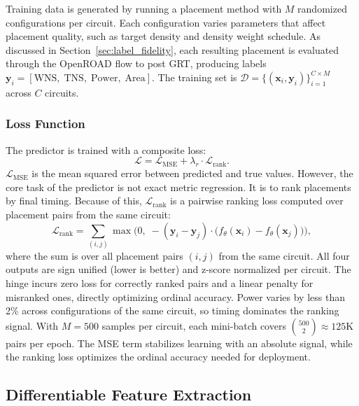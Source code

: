 \documentclass[sigconf,anonymous,review,9pt]{acmart}
\begin{document}
Training data is generated by running a placement method with $M$
randomized configurations per circuit. Each configuration varies
parameters that affect placement quality, such as target density and
density weight schedule. As discussed in Section~\ref{sec:label_fidelity}, each resulting placement is
evaluated through the OpenROAD flow to post GRT, producing
labels $\mathbf{y}_i = [\mathrm{WNS},\; \mathrm{TNS},\;
\mathrm{Power},\; \mathrm{Area}]$. The training set is
$\mathcal{D} = \{(\mathbf{x}_i, \mathbf{y}_i)\}_{i=1}^{C \times M}$
across $C$ circuits.

\subsubsection{Loss Function}

The predictor is trained with a composite loss:
\begin{equation}
\label{eq:loss}
\mathcal{L} = \mathcal{L}_{\mathrm{MSE}}
+ \lambda_r \cdot \mathcal{L}_{\mathrm{rank}}.
\end{equation}
$\mathcal{L}_{\mathrm{MSE}}$ is the mean squared error between
predicted and true values. However, the core task of the predictor is
not exact metric regression. It is to rank placements by final timing.
Because of this, $\mathcal{L}_{\mathrm{rank}}$ is a pairwise ranking loss
computed over placement pairs from the same circuit:
\begin{equation}
\label{eq:ranking}
\mathcal{L}_{\mathrm{rank}} = \sum_{(i,j)}
\max\!\Big(0,\; -(\mathbf{y}_i - \mathbf{y}_j) \cdot
\big(f_\theta(\mathbf{x}_i) - f_\theta(\mathbf{x}_j)\big)\Big),
\end{equation}
where the sum is over all placement pairs $(i, j)$ from the same
circuit. All four outputs are sign unified (lower is better) and
z-score normalized per circuit. The hinge incurs zero loss for
correctly ranked pairs and a linear penalty for misranked ones,
directly optimizing ordinal accuracy. Power varies by less than 2\%
across configurations of the same circuit, so timing dominates the
ranking signal. With $M = 500$ samples per circuit, each mini-batch
covers $\binom{500}{2} \approx 125$K pairs per epoch.
The MSE term stabilizes learning with an absolute signal, while
the ranking loss optimizes the ordinal accuracy needed for deployment.

\subsection{Differentiable Feature Extraction}
\label{subsec:diff_features}
\end{document}
